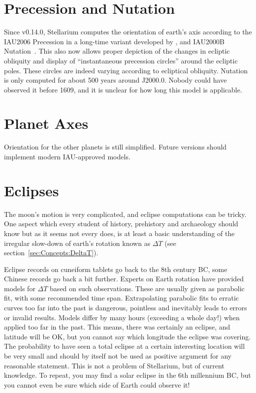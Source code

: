 \section{Precession and Nutation}
\label{sec:Accuracy:Precession}

Since v0.14.0, Stellarium computes the orientation of earth's axis
according to the IAU2006 Precession in a long-time variant developed
by \citet{2011AA:Vondrak}, and IAU2000B Nutation~\citep{Nutation:IAU2000B}.
This also now allows proper depiction of the changes in ecliptic obliquity
and display of ``instantaneous precession circles'' around the
ecliptic poles. These circles are indeed varying according to
ecliptical obliquity. Nutation is only computed for about 500 years
around J2000.0. Nobody could have observed it before 1609, and it is
unclear for how long this model is applicable.

\section{Planet Axes}
\label{sec:Accuracy:PlanetAxes}

Orientation for the other planets is still simplified. Future versions
should implement modern IAU-approved models. 

\section{Eclipses}
\label{sec:Accuracy:Eclipses}

The moon's motion is very complicated, and eclipse computations can be tricky. 
One aspect which every student of history, prehistory and archaeology should 
know but as it seems not every does, is at least a basic understanding of the 
irregular slow-down of earth's rotation known as $\Delta T$ (see section~\ref{sec:Concepts:DeltaT}). 

Eclipse records on cuneiform tablets go back to the 8th century BC, some Chinese 
records go back a bit further. Experts on Earth rotation have provided models 
for $\Delta T$ based on such observations. These are usually given as parabolic fit, 
with some recommended time span. Extrapolating parabolic fits to erratic curves too far into the past is dangerous, 
pointless and inevitably leads to errors or invalid results. Models differ by many hours (exceeding a whole day!)
when applied too far in the past. This means, there was certainly an eclipse, and latitude will be OK, 
but you cannot say which longitude the eclipse was covering. The probability to have seen a total 
eclipse at a certain interesting location will be very small and should by itself not be used as positive argument 
for any reasonable statement. This is not a problem of Stellarium, 
but of current knowledge. To repeat, you may find a solar eclipse in the 6th millennium BC, 
but you cannot even be sure which side of Earth could observe it!


